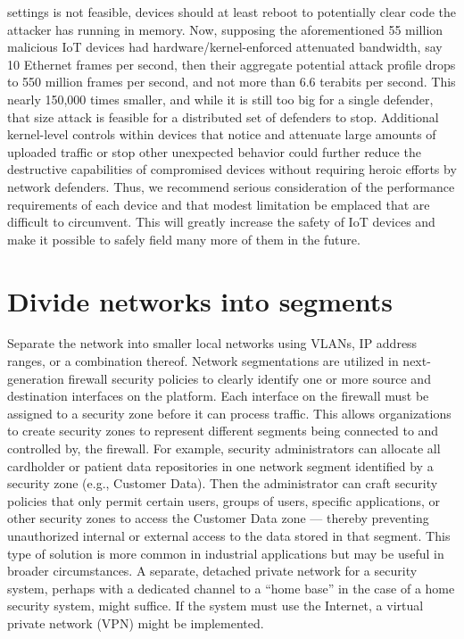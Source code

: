 \documentclass[12pt]{report}
\begin{document}
settings is not feasible, devices should at least reboot to potentially clear code 
the attacker has running in memory. Now, supposing the aforementioned 55 million 
malicious IoT devices had hardware/kernel-enforced attenuated bandwidth, 
say 10 Ethernet frames per second, then their aggregate potential attack profile 
drops to 550 million frames per second, and not more than 6.6 terabits per second. 
This nearly 150,000 times smaller, and while it is still too big for a single defender,
that size attack is feasible for a distributed set of defenders to stop. 
Additional kernel-level controls within devices that notice and attenuate large 
amounts of uploaded traffic or stop other unexpected behavior could further reduce 
the destructive capabilities of compromised devices without requiring heroic 
efforts by network defenders. Thus, we recommend serious consideration of 
the performance requirements of each device and that modest limitation be 
emplaced that are difficult to circumvent. This will greatly increase the 
safety of IoT devices and make it possible to safely field many more of them in 
the future.

\section{Divide networks into segments}

Separate the network into smaller local networks using VLANs, IP address ranges, or a 
combination thereof. Network segmentations are utilized in next-generation firewall 
security policies to clearly identify one or more source and destination interfaces 
on the platform. Each interface on the firewall must be assigned to a security zone 
before it can process traffic. This allows organizations to create security zones to 
represent different segments being connected to and controlled by, the firewall. 
For example, security administrators can allocate all cardholder or patient data 
repositories in one network segment identified by a security zone (e.g., Customer Data).
Then the administrator can craft security policies that only permit certain users, 
groups of users, specific applications, or other security zones to access the 
Customer Data zone — thereby preventing unauthorized internal or external access 
to the data stored in that segment. This type of solution is more common in industrial 
applications but may be useful in broader circumstances. A separate, detached private 
network for a security system, perhaps with a dedicated channel to a “home base” in 
the case of a home security system, might suffice. If the system must use the Internet, 
a virtual private network (VPN) might be implemented.
\end{document}
